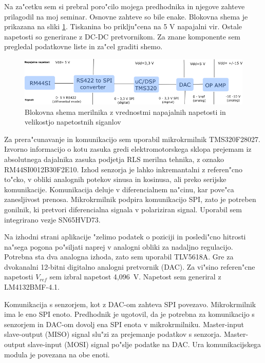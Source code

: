 \documentclass[a4paper]{article}
\begin{document}
Na za"cetku sem si prebral poro"cilo mojega predhodnika in njegove zahteve prilagodil na moj seminar. Osnovne zahteve so bile enake. Blokovna shema je prikazana na sliki \ref{fig:blokovna}.  Tiskanina bo priklju"cena na 5 V napajalni vir. Ostale napetosti so generirane z DC-DC pretvornikom. Za znane komponente sem pregledal podatkovne liste in za"cel graditi shemo.

\begin{figure}[h!]
	\centering
	\includegraphics[width=\linewidth]{blokovna_shema.png}
	\caption{Blokovna shema merilnika z vrednostmi napajalnih napetosti in velikostjo napetostnih siganlov}
	\label{fig:blokovna}
\end{figure}

Za prera"cunavanje in komunikacijo sem uporabil mikrokrmilnik TMS320F28027. Izvorno informacijo o kotu zasuka gredi elektromotorskega sklopa prejemam iz absolutnega dajalnika zasuka podjetja RLS merilna tehnika, z oznako RM44SI0012B30F2E10. Izhod senzorja je lahko inkremantalni z referen"cno to"cko, v obliki analognih potekov sinusa in kosinusa, ali preko serijske komunikacije. Komunikacija deluje v diferencialnem na"cinu, kar pove"ca zanesljivost prenosa. Mikrokrmilnik podpira komunikacijo SPI, zato je potreben gonilnik, ki pretvori diferencialna signala v  polariziran signal. Uporabil sem integrirano vezje SN65HVD73.

Na izhodni strani aplikacije "zelimo podatek o poziciji in posledi"cno hitrosti na"sega pogona po"siljati naprej v analogni obliki za nadaljno regulacijo. Potrebna sta dva analogna izhoda, zato sem uporabil TLV5618A. Gre za dvokanalni 12-bitni digitalno analogni pretvornik (DAC). Za vi"sino referen"cne napetosti $V_{ref}$ sem izbral napetost 4,096~V. Napetost sem generiral z LM4132BMF-4.1. 

Komunikacija s senzorjem, kot z DAC-om zahteva SPI povezavo. Mikrokrmilnik ima le eno SPI enoto. Predhodnik je ugotovil, da je potrebna za komunikacijo s senzorjem in DAC-om dovolj ena SPI enota v mikrokrmilniku. Master-input slave-output (MISO) signal slu"zi za prejemanje podatkov s senzorja. Master-output slave-input (MOSI) signal po"slje podatke na DAC. Ura komunikacijskega modula je povezana na obe enoti. 
\end{document}
